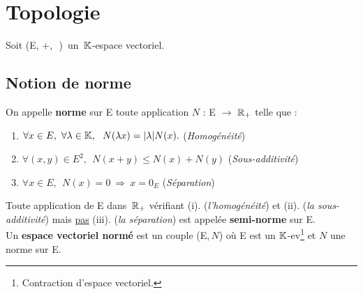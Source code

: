 
\section{Topologie}

\vspace{0.3cm}

\begin{center}
    Soit (E, +,\ \lce\,)\, un \(\,\mathbb{K}\)-espace vectoriel.
\end{center}
\vspace{0.2cm}
\subsection{Notion de norme}

\vspace{0.7cm}

\noindent On appelle \textbf{norme} sur E toute application \(N\) : E \(\to\) \(\mathbb{R}_+\) telle que :\vspace{0.1cm} 
\begin{enumerate}[leftmargin = 2cm, label=(\roman*).\,]
    \item \(\forall x\in E,\ \forall \lambda \in \mathbb{K},\ \ N(\lambda x)=|\lambda |N(x). \) \hspace{1cm} (\emph{Homogénéité})\vspace{0.1cm}

    \item \(\forall (x,y)\in E^2,\ \ N(x+y)\leq N(x)+N(y) \) \hspace{0.4cm} (\emph{Sous-additivité}) \vspace{0.1cm}

    \item \(\forall x\in E,\ \ N(x)=0\ \Rightarrow \ x=0_E \) \hspace{2cm} (\emph{Séparation})
\end{enumerate}
\vspace{0.7cm}
\noindent Toute application de E dans \(\,\mathbb{R}_+\) vérifiant (i). (\emph{l'homogénéité}) et (ii). (\emph{la sous-additivité}) mais \underline{pas} (iii). (\emph{la séparation}) est appelée \textbf{semi-norme} sur E.\vspace{0.1cm}\\
\noindent Un \textbf{espace vectoriel normé} est un couple (E,\(\,N\)) où E est un \(\mathbb{K}\)-ev\footnote{Contraction d'\guillemotleft espace vectoriel\guillemotright .} et \(N\) une norme sur E.

\vspace{1.3cm}

